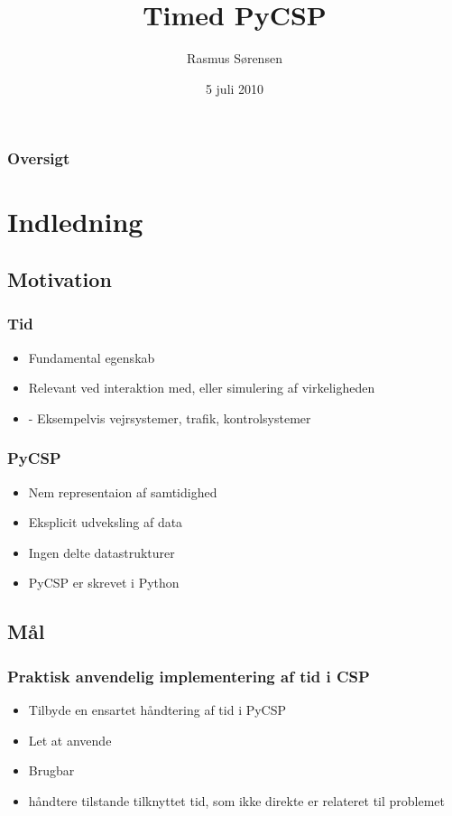 \documentclass[12pt]{beamer}
\title
{Timed PyCSP}
\institute
{Datalogisk Institut \\ Københavns Universitet}
\author
{Rasmus Sørensen}
\date
{5 juli 2010}
\begin{document}
\frame[plain]\titlepage

\begin{frame}
  \frametitle{Oversigt}
  \tableofcontents
\end{frame}

\section{Indledning}
\subsection{Motivation}
\begin{frame}
  \frametitle{Tid}
  \begin{itemize}
	\item Fundamental egenskab
	\item Relevant ved interaktion med, eller simulering af virkeligheden
	\item - Eksempelvis vejrsystemer, trafik, kontrolsystemer 
  \end{itemize}
\end{frame}

\begin{frame}
  \frametitle{PyCSP}
  \begin{itemize}
	\item  Nem representaion af samtidighed
	\item Eksplicit udveksling af data
	\item Ingen delte datastrukturer
	\item PyCSP er skrevet i Python
 \end{itemize}
\end{frame}

\subsection{Mål}
\begin{frame}
  \frametitle{Praktisk anvendelig implementering af tid i CSP}
  \begin{itemize}
	\item Tilbyde en ensartet håndtering af tid i PyCSP
	\item Let at anvende
	\item Brugbar
	\item håndtere tilstande tilknyttet tid, som ikke direkte er relateret til problemet
  \end{itemize}
\end{frame}
\end{document}
